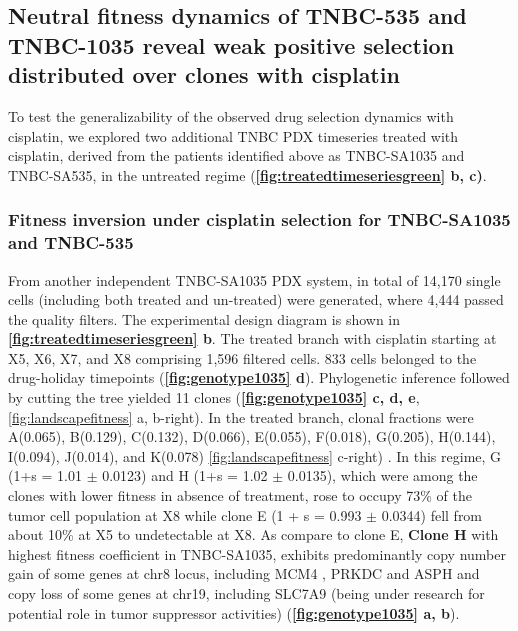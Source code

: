 
\subsection{Neutral fitness dynamics of TNBC-535 and TNBC-1035 reveal weak positive selection distributed over clones with cisplatin}
To test the generalizability of the observed drug selection dynamics with cisplatin, we explored two additional TNBC PDX timeseries treated with cisplatin, derived from the patients identified above as TNBC-SA1035 and TNBC-SA535, in the untreated regime  (\textbf{\autoref{fig:treatedtimeseriesgreen} b, c)}. 

\subsubsection{Fitness inversion under cisplatin selection for TNBC-SA1035 and TNBC-535}
From another independent TNBC-SA1035 PDX system, in total of 14,170 single cells (including both treated and un-treated) were generated, where 4,444 passed the quality filters. The experimental design diagram is shown in \textbf{\autoref{fig:treatedtimeseriesgreen} b}.
 The treated branch with cisplatin starting at X5, X6, X7, and X8 comprising 1,596 filtered cells. 833 cells belonged to the drug-holiday timepoints (\textbf{\autoref{fig:genotype1035} d}). Phylogenetic inference followed by cutting the tree yielded 11 clones (\textbf{\autoref{fig:genotype1035} c, d, e}, {\autoref{fig:landscapefitness} a, b-right}). In the treated branch, clonal fractions were A(0.065), B(0.129), C(0.132), D(0.066), E(0.055), F(0.018), G(0.205), H(0.144), I(0.094), J(0.014), and K(0.078) {\autoref{fig:landscapefitness} c-right}) . In this regime, G (1+s = 1.01 $\pm$ 0.0123) and H (1+s = 1.02 $\pm$ 0.0135), which were among the clones with lower fitness in absence of treatment, rose to occupy 73\% of the tumor cell population at X8 while clone E (1 + s = 0.993 $\pm$ 0.0344) fell from about 10\% at X5 to undetectable at X8. As compare to clone E,
 \textbf{Clone H} with highest fitness coefficient in TNBC-SA1035, exhibits predominantly copy number gain of some genes at chr8 locus, including MCM4 \cite {issac2019mcm2, stoeber2001dna, kwok2015prognostic}, PRKDC \cite {tan2020prkdc, sun2017prkdc, zhang2019prkdc} and ASPH and copy loss of some genes at chr19, including SLC7A9 (being under research for potential role in tumor suppressor activities) \cite {bhutia2016slc, ji2018function, broer2020amino, ganapathy2015slc5a8, gupta2006slc5a8} (\textbf{\autoref{fig:genotype1035} a, b}).
 
